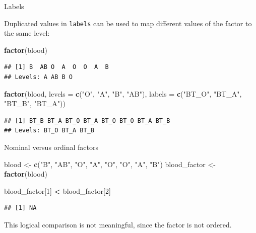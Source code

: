 \documentclass[ignorenonframetext,]{beamer}
\newenvironment{Shaded}{\begin{snugshade}}{\end{snugshade}}
\newcommand{\DataTypeTok}[1]{\textcolor[rgb]{0.13,0.29,0.53}{#1}}
\newcommand{\DecValTok}[1]{\textcolor[rgb]{0.00,0.00,0.81}{#1}}
\newcommand{\KeywordTok}[1]{\textcolor[rgb]{0.13,0.29,0.53}{\textbf{#1}}}
\newcommand{\NormalTok}[1]{#1}
\newcommand{\OperatorTok}[1]{\textcolor[rgb]{0.81,0.36,0.00}{\textbf{#1}}}
\newcommand{\StringTok}[1]{\textcolor[rgb]{0.31,0.60,0.02}{#1}}
\begin{document}
\begin{frame}[fragile]{Labels}
\protect\hypertarget{labels}{}

Duplicated values in \texttt{labels} can be used to map different values
of the factor to the same level:

\begin{Shaded}
\begin{Highlighting}[]
\KeywordTok{factor}\NormalTok{(blood)}
\end{Highlighting}
\end{Shaded}

\begin{verbatim}
## [1] B  AB O  A  O  O  A  B 
## Levels: A AB B O
\end{verbatim}

\begin{Shaded}
\begin{Highlighting}[]
\KeywordTok{factor}\NormalTok{(blood,}
         \DataTypeTok{levels =} \KeywordTok{c}\NormalTok{(}\StringTok{"O"}\NormalTok{, }\StringTok{"A"}\NormalTok{, }\StringTok{"B"}\NormalTok{, }\StringTok{"AB"}\NormalTok{),}
         \DataTypeTok{labels =} \KeywordTok{c}\NormalTok{(}\StringTok{"BT_O"}\NormalTok{, }\StringTok{"BT_A"}\NormalTok{, }\StringTok{"BT_B"}\NormalTok{, }\StringTok{"BT_A"}\NormalTok{))}
\end{Highlighting}
\end{Shaded}

\begin{verbatim}
## [1] BT_B BT_A BT_O BT_A BT_O BT_O BT_A BT_B
## Levels: BT_O BT_A BT_B
\end{verbatim}

\end{frame}

\begin{frame}[fragile]{Nominal versus ordinal factors}
\protect\hypertarget{nominal-versus-ordinal-factors}{}

\begin{Shaded}
\begin{Highlighting}[]
\NormalTok{blood <-}\StringTok{ }\KeywordTok{c}\NormalTok{(}\StringTok{"B"}\NormalTok{, }\StringTok{"AB"}\NormalTok{, }\StringTok{"O"}\NormalTok{, }\StringTok{"A"}\NormalTok{, }\StringTok{"O"}\NormalTok{, }\StringTok{"O"}\NormalTok{, }\StringTok{"A"}\NormalTok{, }\StringTok{"B"}\NormalTok{) }
\NormalTok{blood_factor <-}\StringTok{ }\KeywordTok{factor}\NormalTok{(blood)}

\NormalTok{blood_factor[}\DecValTok{1}\NormalTok{] }\OperatorTok{<}\StringTok{ }\NormalTok{blood_factor[}\DecValTok{2}\NormalTok{]}
\end{Highlighting}
\end{Shaded}

\begin{verbatim}
## [1] NA
\end{verbatim}

This logical comparison is not meaningful, since the factor is not
ordered.

\end{frame}
\end{document}
